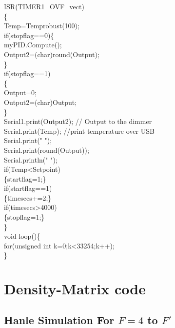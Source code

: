 \begin{enumerate}
\noindent ISR(TIMER1\_OVF\_vect)\\
\{\\
	Temp=Temprobust(100);\\
	if(stopflag==0)\{\\
		myPID.Compute();\\
		Output2=(char)round(Output);\\
	\}\\
	if(stopflag==1)\\
	\{\\
		Output=0;\\
		Output2=(char)Output;\\
	\}\\
	Serial1.print(Output2);  // Output to the dimmer  \\
	Serial.print(Temp);  //print temperature over USB\\
	Serial.print("  ");\\
	Serial.print(round(Output));\\
	Serial.println(" ");\\
	if(Temp\textless Setpoint)\\
	\{startflag=1;\}\\
	if(startflag==1)\\
	\{timesecs+=2;\}\\
	if(timesecs\textgreater 4000)\\
	\{stopflag=1;\}\\
\}\\

\noindent void loop()\{\\
	for(unsigned int k=0;k\textless 33254;k++);\\
\}


\chapter{Density-Matrix code}

\section{Hanle Simulation For $F=4$ to $F'$}


\end{enumerate}
